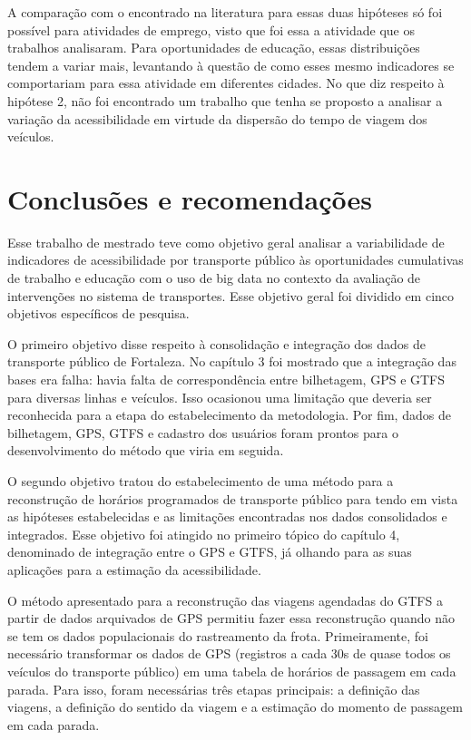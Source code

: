 \documentclass[        
    a4paper,          %
    12pt,             %
    chapter=TITLE,    %
    section=Title,    %
    subsection=Title, %
    oneside,          %
    english,          %
    spanish,          %
    brazil,           %
    fleqn             %
]{abntex2}
\begin{document}
  A comparação com o encontrado na literatura para essas duas hipóteses só foi possível para atividades de emprego, visto que foi essa a atividade que os trabalhos analisaram. Para oportunidades de educação, essas distribuições tendem a variar mais, levantando à questão de como esses mesmo indicadores se comportariam para essa atividade em diferentes cidades. No que diz respeito à hipótese 2, não foi encontrado um trabalho que tenha se proposto a analisar a variação da acessibilidade em virtude da dispersão do tempo de viagem dos veículos.
  
  \hypertarget{conclusoes-e-recomendacoes}{%
  \chapter{Conclusões e recomendações}\label{conclusoes-e-recomendacoes}}
  
  Esse trabalho de mestrado teve como objetivo geral analisar a variabilidade de indicadores de acessibilidade por transporte público às oportunidades cumulativas de trabalho e educação com o uso de big data no contexto da avaliação de intervenções no sistema de transportes. Esse objetivo geral foi dividido em cinco objetivos específicos de pesquisa.
  
  O primeiro objetivo disse respeito à consolidação e integração dos dados de transporte público de Fortaleza. No capítulo 3 foi mostrado que a integração das bases era falha: havia falta de correspondência entre bilhetagem, GPS e GTFS para diversas linhas e veículos. Isso ocasionou uma limitação que deveria ser reconhecida para a etapa do estabelecimento da metodologia. Por fim, dados de bilhetagem, GPS, GTFS e cadastro dos usuários foram prontos para o desenvolvimento do método que viria em seguida.
  
  O segundo objetivo tratou do estabelecimento de uma método para a reconstrução de horários programados de transporte público para tendo em vista as hipóteses estabelecidas e as limitações encontradas nos dados consolidados e integrados. Esse objetivo foi atingido no primeiro tópico do capítulo 4, denominado de integração entre o GPS e GTFS, já olhando para as suas aplicações para a estimação da acessibilidade.
  
  O método apresentado para a reconstrução das viagens agendadas do GTFS a partir de dados arquivados de GPS permitiu fazer essa reconstrução quando não se tem os dados populacionais do rastreamento da frota. Primeiramente, foi necessário transformar os dados de GPS (registros a cada 30s de quase todos os veículos do transporte público) em uma tabela de horários de passagem em cada parada. Para isso, foram necessárias três etapas principais: a definição das viagens, a definição do sentido da viagem e a estimação do momento de passagem em cada parada.
  
\end{document}
